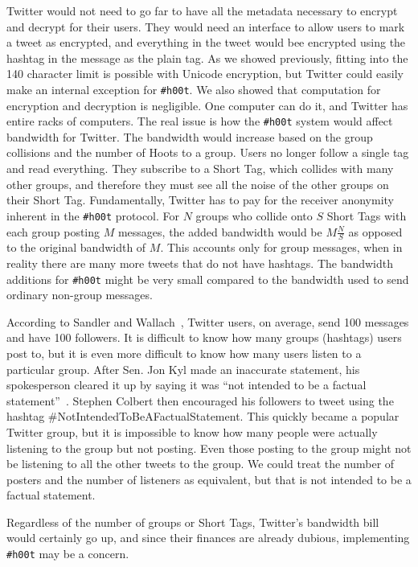 \documentclass{sig-alternate-arxiv}
\newcommand{\hlfixme}[1]{\fixme{\hl{#1}}}
\newcommand{\hoot}{{\tt \#h00t}\xspace}
\begin{document}
Twitter would not need to go far to have all the metadata necessary to encrypt and decrypt for their users. They would need an interface to allow users to mark a tweet as encrypted, and everything in the tweet would bee encrypted using the hashtag in the message as the plain tag. As we showed previously, fitting into the 140 character limit is possible with Unicode encryption, but Twitter could easily make an internal exception for \hoot. We also showed that computation for encryption and decryption is negligible. One computer can do it, and Twitter has entire racks of computers. The real issue is how the \hoot system would affect bandwidth for Twitter. The bandwidth would increase based on the group collisions and the number of Hoots to a group. Users no longer follow a single tag and read everything. They subscribe to a Short Tag, which collides with many other groups, and therefore they must see all the noise of the other groups on their Short Tag. Fundamentally, Twitter has to pay for the receiver anonymity inherent in the \hoot protocol. 
For $N$ groups who collide onto $S$ Short Tags with each group posting $M$ messages, the added bandwidth would be $M\frac{N}{S}$ as opposed to the original bandwidth of $M$. This accounts only for group messages, when in reality there are many more tweets that do not have hashtags. The bandwidth additions for \hoot might be very small compared to the bandwidth used to send ordinary non-group messages.

According to Sandler and Wallach~\cite{sandler09}, Twitter users, on average, send 100 messages and have 100 followers. It is difficult to know how many groups (hashtags) users post to, but it is even more difficult to know how many users listen to a particular group. After Sen. Jon Kyl made an inaccurate statement, his spokesperson cleared it up by saying it was ``not intended to be a factual statement''~\cite{politico11}. Stephen Colbert then encouraged his followers to tweet using the hashtag \#NotIntendedToBeAFactualStatement. This quickly became a popular Twitter group, but it is impossible to know how many people were actually listening to the group but not posting. Even those posting to the group might not be listening to all the other tweets to the group. We could treat the number of posters and the number of listeners as equivalent, but that is not intended to be a factual statement.

Regardless of the number of groups or Short Tags, Twitter's bandwidth bill would certainly go up, and since their finances are already dubious, implementing \hoot may be a concern.
\end{document}
